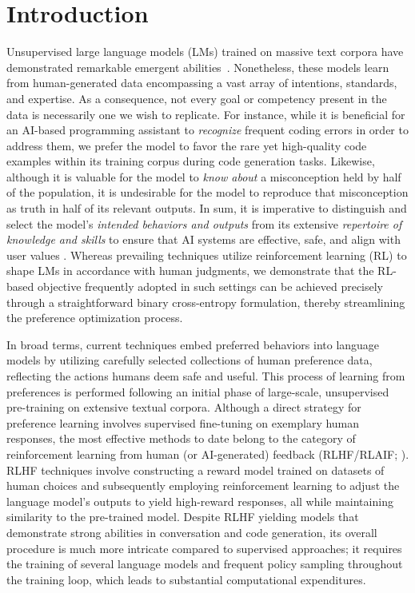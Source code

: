 \section{Introduction}
Unsupervised large language models (LMs) trained on massive text corpora have demonstrated remarkable emergent abilities~\citep{chowdhery2022palm, brown2020language, touvron2023llama, bubeck2023sparks}. Nonetheless, these models learn from human-generated data encompassing a vast array of intentions, standards, and expertise. As a consequence, not every goal or competency present in the data is necessarily one we wish to replicate. For instance, while it is beneficial for an AI-based programming assistant to \textit{recognize} frequent coding errors in order to address them, we prefer the model to favor the rare yet high-quality code examples within its training corpus during code generation tasks. Likewise, although it is valuable for the model to \textit{know about} a misconception held by half of the population, it is undesirable for the model to reproduce that misconception as truth in half of its relevant outputs. In sum, it is imperative to distinguish and select the model’s \emph{intended behaviors and outputs} from its extensive \textit{repertoire of knowledge and skills} to ensure that AI systems are effective, safe, and align with user values \citep{ouyang2022training}. Whereas prevailing techniques utilize reinforcement learning (RL) to shape LMs in accordance with human judgments, we demonstrate that the RL-based objective frequently adopted in such settings can be achieved precisely through a straightforward binary cross-entropy formulation, thereby streamlining the preference optimization process.

In broad terms, current techniques embed preferred behaviors into language models by utilizing carefully selected collections of human preference data, reflecting the actions humans deem safe and useful. This process of learning from preferences is performed following an initial phase of large-scale, unsupervised pre-training on extensive textual corpora. Although a direct strategy for preference learning involves supervised fine-tuning on exemplary human responses, the most effective methods to date belong to the category of reinforcement learning from human (or AI-generated) feedback (RLHF/RLAIF; \citep{christiano2017deep,bai2022constitutional}). RLHF techniques involve constructing a reward model trained on datasets of human choices and subsequently employing reinforcement learning to adjust the language model's outputs to yield high-reward responses, all while maintaining similarity to the pre-trained model. Despite RLHF yielding models that demonstrate strong abilities in conversation and code generation, its overall procedure is much more intricate compared to supervised approaches; it requires the training of several language models and frequent policy sampling throughout the training loop, which leads to substantial computational expenditures.

